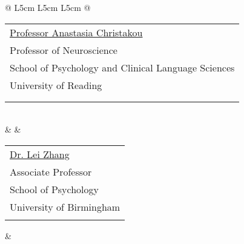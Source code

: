 
\noindent\begin{tabular}{@{} L{5cm} L{5cm} L{5cm} @{}}
	\begin{tabular}{l}
		\href{https://anastasia.christakou.org/}{Professor Anastasia Christakou} \\
		Professor of Neuroscience \\
		School of Psychology and Clinical Language Sciences \\
		University of Reading \\
		\email{a.christakou@reading.ac.uk} \\
		\phone{+44\,(0)\,118 378 6298}
	\end{tabular} \\
	& & \\
	\begin{tabular}{l}
		\href{https://lei-zhang.net/}{Dr. Lei Zhang} \\
		Associate Professor \\
		School of Psychology \\
		University of Birmingham \\
		\email{l.zhang.13@bham.ac.uk} \\
	\end{tabular}
	&
\end{tabular}
